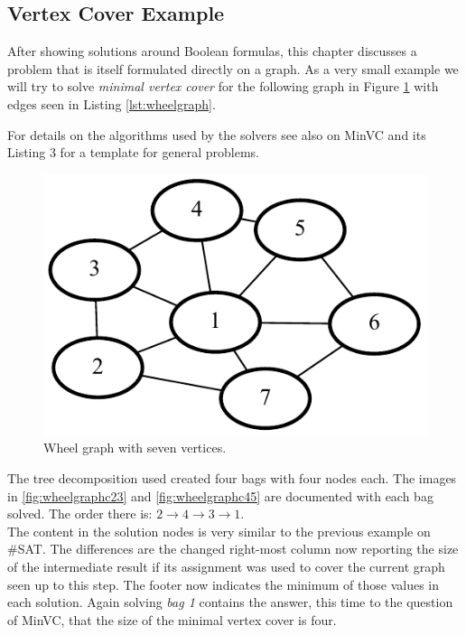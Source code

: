 \documentclass[a4paper, 12pt, bibliography=totoc]{scrartcl}
\begin{document}
\subsection{Vertex Cover Example}\label{sec:minvc}

After showing solutions around Boolean formulas, this chapter discusses a problem that is itself formulated directly on a graph.
As a very small example we will try to solve \textit{minimal vertex cover} for the following graph in Figure \ref{fig:wheelgraph} with edges seen in Listing \ref{lst:wheelgraph}.
%


For details on the algorithms used by the solvers see also \cite[Ch. 4.2]{dpdbpadl2020} on MinVC and its Listing 3 for a template for general problems.


\begin{figure}[H]
	\centering
	\includegraphics[]{images/WheelGraph7/graph1.pdf}
	\caption{Wheel graph with seven vertices.}
	\label{fig:wheelgraph}
\end{figure}

The tree decomposition used created four bags with four nodes each.
The images in \ref{fig:wheelgraphc23} and \ref{fig:wheelgraphc45} are documented with each bag solved. The order there is: $2 \rightarrow 4 \rightarrow 3 \rightarrow 1$.\\
\medskip\noindent
The content in the solution nodes is very similar to the previous example on \#SAT.
The differences are the changed right-most column now reporting the size of the intermediate result if its assignment was used to cover the current graph seen up to this step. The footer now indicates the minimum of those values in each solution.
Again solving \textit{bag 1} contains the answer, this time to the question of MinVC, that the size of the minimal vertex cover is four.\\
\end{document}
